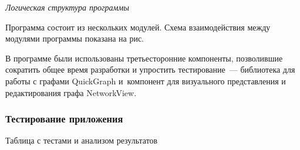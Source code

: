 \textit{Логическая структура программы}

Программа состоит из нескольких модулей. Схема взаимодействия между модулями программы показана на рис.

В программе были использованы третьесторонние компоненты, позволившие сократить общее время разработки и упростить тестирование~--- библиотека для работы с графами QuickGraph и~компонент для визуального представления и редактирования графа NetworkView.

\subsubsection*{Тестирование приложения}


Таблица с тестами и анализом результатов